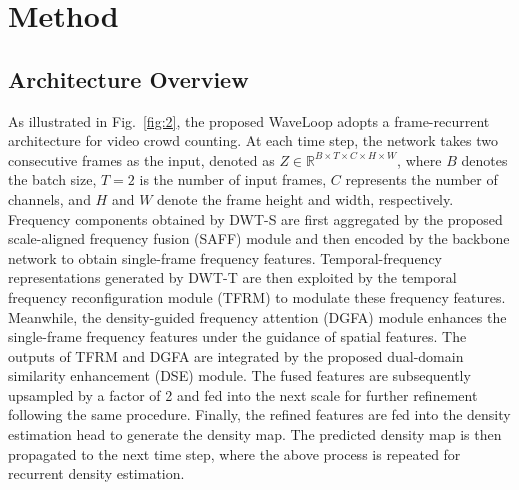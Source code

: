 \documentclass[lettersize,journal]{IEEEtran}
\begin{document}
\section{Method}
\subsection{Architecture Overview}
\label{Waveloop}
As illustrated in Fig.~\ref{fig:2}, the proposed WaveLoop adopts a frame-recurrent architecture for video crowd counting. At each time step, the network takes two consecutive frames as the input, denoted as \(Z\in\mathbb{R}^{B\times T\times C\times H\times W}\), where \(B\) denotes the batch size, \(T=2\) is the number of input frames, \(C\) represents the number of channels, and \(H\) and \(W\) denote the frame height and width, respectively. Frequency components obtained by DWT-S are first aggregated by the proposed scale-aligned frequency fusion (SAFF) module and then encoded by the backbone network to obtain single-frame frequency features. Temporal-frequency representations generated by DWT-T are then exploited by the temporal frequency reconfiguration module (TFRM) to modulate these frequency features. Meanwhile, the density-guided frequency attention (DGFA) module enhances the single-frame frequency features under the guidance of spatial features. The outputs of TFRM and DGFA are integrated by the proposed dual-domain similarity enhancement (DSE) module. The fused features are subsequently upsampled by a factor of 2 and fed into the next scale for further refinement following the same procedure. Finally, the refined features are fed into the density estimation head to generate the density map. The predicted density map is then propagated to the next time step, where the above process is repeated for recurrent density estimation.
\end{document}
